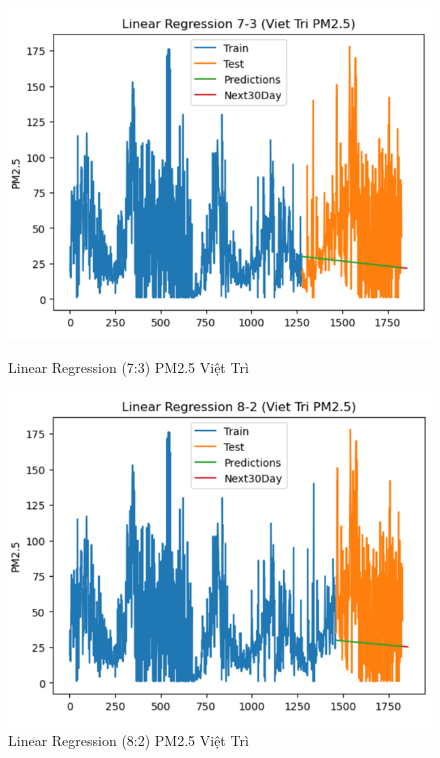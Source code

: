 \begin{figure}[h]
        \begin{minipage}[b]{0.45\linewidth}
        \centering
        \includegraphics[width=\linewidth]{img/LN_7_3_VT.png}
        \caption{\scriptsize Linear Regression (7:3) PM2.5  Việt Trì}
        \label{fig1}
    \end{minipage}\hfill
    \begin{minipage}[b]{0.45\linewidth}
        \centering
        \includegraphics[width=\linewidth]{img/LN_8_2_VT.png}
        \caption{\scriptsize Linear Regression (8:2) PM2.5 Việt Trì}
        \label{fig2}
    \end{minipage}
        \begin{minipage}[b]{0.45\linewidth}

\end{minipage}
\end{figure}
